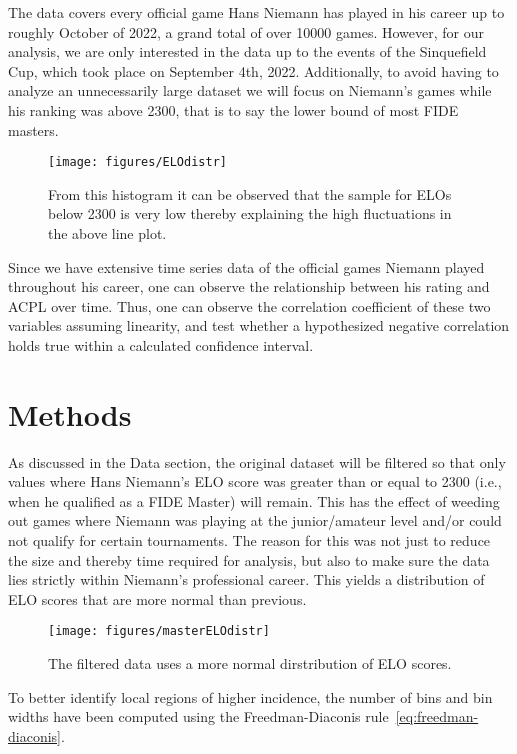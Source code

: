 \documentclass[12pt, letterpaper, titlepage]{article}
\begin{document}
The data covers every official game Hans Niemann has played in his career up to roughly October of 2022, a grand total of over 10000 games. However, for our analysis, we are only interested in the data up to the events of the Sinquefield Cup, which took place on September 4th, 2022. Additionally, to avoid having to analyze an unnecessarily large dataset we will focus on Niemann's games while his ranking was above 2300, that is to say the lower bound of most FIDE masters.

\begin{figure}[!htb]
    \centering
    \texttt{[image: figures/ELOdistr]}
    \caption{From this histogram it can be observed that the sample for ELOs below 2300 is very low thereby explaining the high fluctuations in the above line plot.}
    \label{fig:elo_histplot}
\end{figure}

Since we have extensive time series data of the official games Niemann played throughout his career, one can observe the relationship between his rating and ACPL over time. Thus, one can observe the correlation coefficient of these two variables assuming linearity, and test whether a hypothesized negative correlation holds true within a calculated confidence interval.

\section{Methods}
\label{sec:meth}

As discussed in the Data section, the original dataset will be filtered so that only values where Hans Niemann's ELO score was greater than or equal to 2300 (i.e., when he qualified as a FIDE Master) will remain. This has the effect of weeding out games where Niemann was playing at the junior/amateur level and/or could not qualify for certain tournaments. The reason for this was not just to reduce the size and thereby time required for analysis, but also to make sure the data lies strictly within Niemann's professional career. This yields a distribution of ELO scores that are more normal than previous.

\begin{figure}[!htb]
    \centering
    \texttt{[image: figures/masterELOdistr]}
    \caption{The filtered data uses a more normal dirstribution of ELO scores.}
    \label{fig:elogt23_histplot}
\end{figure}

To better identify local regions of higher incidence, the number of bins and bin widths have been computed using the Freedman-Diaconis rule~\ref{eq:freedman-diaconis}.
\end{document}

